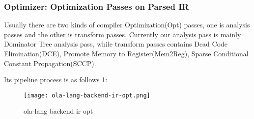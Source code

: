 \subsubsection{Optimizer: Optimization Passes on Parsed IR}

Usually there are two kinds of compiler Optimization(Opt) passes, one is analysis passes and the other is transform passes.
Currently our analysis pass is mainly Dominator Tree analysis pass,
while transform passes contains Dead Code Elimination(DCE), Promote Memory to Register(Mem2Reg), Sparse Conditional Constant Propagation(SCCP).

Its pipeline process is as follows \ref{fig:ola-lang-backend-ir-opt}:
\begin{figure}[!htbp]
    \centering
    \texttt{[image: ola-lang-backend-ir-opt.png]}
    \caption{ola-lang backend ir opt}
    \label{fig:ola-lang-backend-ir-opt}
\end{figure}
